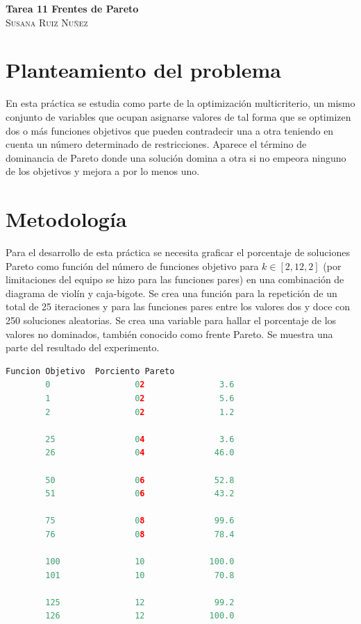\documentclass{article}
\begin{document}
	\begin{center}
	\huge{\textbf{Tarea 11 Frentes de Pareto}}\\
	
	\textsc{ \Large Susana Ruiz Nuñez}
	\end{center}


\section{Planteamiento del problema} 
En esta práctica \cite{satu} se estudia como parte de la optimización multicriterio, un mismo conjunto de variables que ocupan asignarse valores de tal forma que se optimizen dos o más funciones objetivos que pueden contradecir una a otra teniendo en cuenta un número determinado de restricciones. Aparece el término de dominancia de Pareto donde una solución domina a otra si no empeora ninguno de los objetivos y mejora a por lo menos uno. 

\section{Metodología}
Para el desarrollo de esta práctica se necesita graficar el porcentaje de soluciones Pareto como función del número de funciones objetivo para $k \in [2, 12, 2]$ (por limitaciones del equipo se hizo para las funciones pares) en una combinación de diagrama de violín y caja-bigote. Se crea una función para la repetición de un total de 25 iteraciones y para las funciones pares entre los valores dos y doce con 250 soluciones aleatorias. Se crea una variable para hallar el porcentaje de los valores no dominados, también conocido como frente Pareto. Se muestra una parte del resultado del experimento.  

\begin{lstlisting}[language=Python]
			Funcion Objetivo  Porciento Pareto
		0                 02               3.6
		1                 02               5.6
		2                 02               1.2
	
		25                04               3.6
		26                04              46.0
	
		50                06              52.8
		51                06              43.2
	
		75                08              99.6
		76                08              78.4
	
		100               10             100.0
		101               10              70.8
	
		125               12              99.2
		126               12             100.0
\end{lstlisting}
\end{document}
